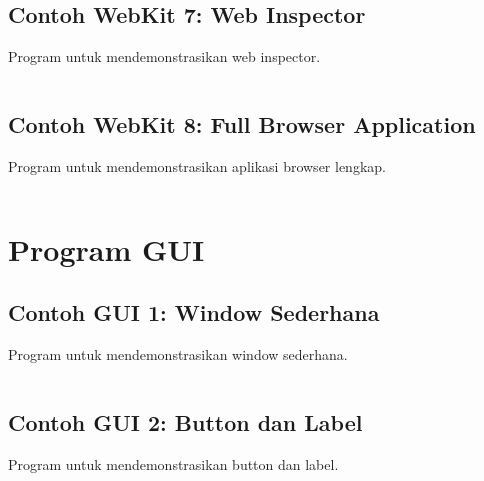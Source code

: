 \subsection{Contoh WebKit 7: Web Inspector}

Program untuk mendemonstrasikan web inspector.

\begin{lstlisting}[language=c++, caption=Web Inspector]

\end{lstlisting}

\subsection{Contoh WebKit 8: Full Browser Application}

Program untuk mendemonstrasikan aplikasi browser lengkap.

\begin{lstlisting}[language=c++, caption=Full Browser Application]

\end{lstlisting}

\section{Program GUI}

\subsection{Contoh GUI 1: Window Sederhana}

Program untuk mendemonstrasikan window sederhana.

\begin{lstlisting}[language=c++, caption=Window Sederhana]

\end{lstlisting}

\subsection{Contoh GUI 2: Button dan Label}

Program untuk mendemonstrasikan button dan label.

\begin{lstlisting}[language=c++, caption=Button dan Label]

\end{lstlisting}

